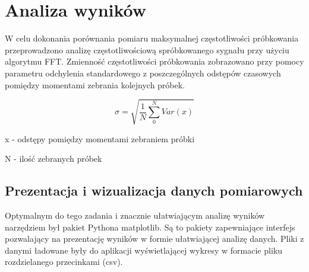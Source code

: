 \section{Analiza wyników}
W celu dokonania porównania pomiaru maksymalnej częstotliwości próbkowania przeprowadzono analizę częstotliwościową spróbkowanego sygnału przy użyciu algorytmu FFT.
Zmienność częstotliwości próbkowania zobrazowano przy pomocy parametru odchylenia standardowego z poszczególnych odstępów czasowych pomiędzy momentami zebrania kolejnych próbek.

\begin{equation}
\sigma=\sqrt{\dfrac{1}{N}\sum_{0}^{N}{Var(x)}}
\end{equation}

x - odstępy pomiędzy momentami zebraniem próbki

N - ilość zebranych próbek


\subsection{Prezentacja i wizualizacja danych pomiarowych}
Optymalnym do tego zadania i znacznie ułatwiającym analizę wyników narzędziem był pakiet Pythona matplotlib. Są to pakiety zapewniające interfejs pozwalający na prezentację wyników w formie ułatwiającej analizę danych. Pliki z danymi ładowane były do aplikacji wyświetlającej wykresy w formacie pliku rozdzielanego przecinkami (csv).  



